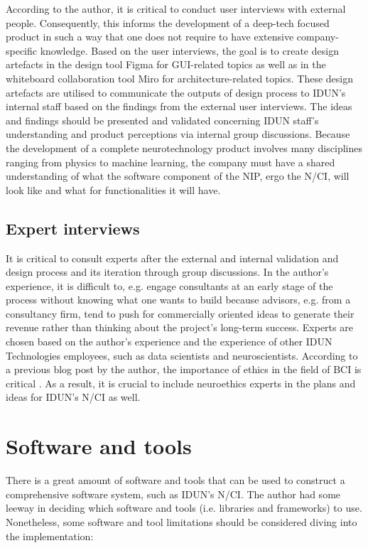 According to the author, it is critical to conduct user interviews with external people. Consequently, this informs the development of a deep-tech focused product in such a way that one does not require to have extensive company-specific knowledge. Based on the user interviews, the goal is to create design artefacts in the design tool Figma for GUI-related topics as well as in the whiteboard collaboration tool Miro for architecture-related topics. These design artefacts are utilised to communicate the outputs of design process to IDUN's internal staff based on the findings from the external user interviews. The ideas and findings should be presented and validated concerning IDUN staff's understanding and product perceptions via internal group discussions. Because the development of a complete neurotechnology product involves many disciplines ranging from physics to machine learning, the company must have a shared understanding of what the software component of the NIP, ergo the N/CI, will look like and what for functionalities it will have.

\subsection{Expert interviews}
\label{chapter3-expert-interviews}

It is critical to consult experts after the external and internal validation and design process and its iteration through group discussions. In the author's experience, it is difficult to, e.g. engage consultants at an early stage of the process without knowing what one wants to build because advisors, e.g. from a consultancy firm, tend to push for commercially oriented ideas to generate their revenue rather than thinking about the project's long-term success. Experts are chosen based on the author's experience and the experience of other IDUN Technologies employees, such as data scientists and neuroscientists. According to a previous blog post by the author, the importance of ethics in the field of BCI is critical \citep{burger_influence_2021}. As a result, it is crucial to include neuroethics experts in the plans and ideas for IDUN's N/CI as well.

\section{Software and tools}
\label{chapter3-software-and-tools}

There is a great amount of software and tools that can be used to construct a comprehensive software system, such as IDUN's N/CI. The author had some leeway in deciding which software and tools (i.e. libraries and frameworks) to use. Nonetheless, some software and tool limitations should be considered diving into the implementation:

